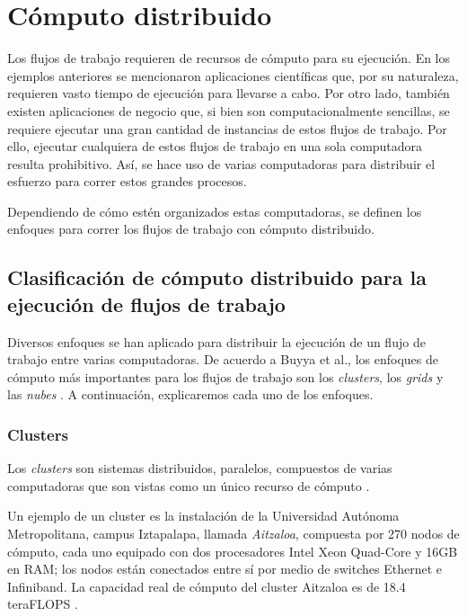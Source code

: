 \documentclass[letterpaper, 12pt]{report}
\begin{document}


\chapter{Cómputo distribuido}
Los flujos de trabajo requieren de recursos de cómputo para su ejecución. En los ejemplos anteriores se mencionaron aplicaciones científicas que, por su naturaleza, requieren vasto tiempo de ejecución para llevarse a cabo. Por otro lado, también existen aplicaciones de negocio que, si bien son computacionalmente sencillas, se requiere ejecutar una gran cantidad de instancias de estos flujos de trabajo. Por ello, ejecutar cualquiera de estos flujos de trabajo en una sola computadora resulta prohibitivo. Así, se hace uso de varias computadoras para distribuir el esfuerzo para correr estos grandes procesos.

Dependiendo de cómo estén organizados estas computadoras, se definen los enfoques para correr los flujos de trabajo con cómputo distribuido.

\section{Clasificación de cómputo distribuido para la ejecución de flujos de trabajo}
Diversos enfoques se han aplicado para distribuir la ejecución de un flujo de trabajo entre varias computadoras.  De acuerdo a Buyya et al., los enfoques de cómputo más importantes para los flujos de trabajo son los \emph{clusters}, los \emph{grids} y las \emph{nubes} \cite{buyya2009cloud}. A continuación, explicaremos cada uno de los enfoques.

\subsection{Clusters}
Los \emph{clusters} son sistemas distribuidos, paralelos, compuestos de varias computadoras que son vistas como un único recurso de cómputo \cite{buyya2009cloud}. 

Un ejemplo de un cluster es la instalación de la Universidad Autónoma Metropolitana, campus Iztapalapa, llamada \emph{Aitzaloa}, compuesta por 270 nodos de cómputo, cada uno equipado con dos procesadores Intel Xeon Quad-Core y 16GB en RAM; los nodos están conectados entre sí por medio de switches Ethernet e Infiniband. La capacidad real de cómputo del cluster Aitzaloa es de 18.4 teraFLOPS \cite{uamz2013tizaloa}.
\end{document}
